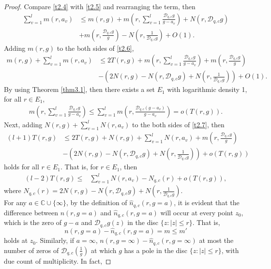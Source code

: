 \documentclass[sn-mathphys-num]{sn-jnl}%
\theoremstyle{thmstyleone}%
\theoremstyle{thmstyletwo}%
\theoremstyle{thmstylethree}%
\begin{document}
\begin{proof}
	Compare \eqref{t2.4} with \eqref{t2.5} and rearranging the term, then
	\begin{align}\label{t2.6}
		\sum_{v=1}^{l}m(r,a_{v})&\leq m(r,g)+m\left(r,\sum_{v=1}^{l}\frac{\mathcal{D}_{q,c}g}{g-a_{v}}\right)+N(r,\mathcal{D}_{q,c}g)\nonumber\\
		&+m\left(r,\frac{\mathcal{D}_{q,c}g}{g}\right)-N\left(r,\frac{1}{\mathcal{D}_{q,c}g}\right)+O(1).
	\end{align}
	\indent Adding $m(r,g)$ to the both sides of \eqref{t2.6},
	\begin{align}\label{t2.7}
		m(r,g)+\sum_{v=1}^{l}m(r,a_{v})&\leq 2T(r,g)+m\left(r,\sum_{v=1}^{l}\frac{\mathcal{D}_{q,c}g}{g-a_{v}}\right)
		+m\left(r,\frac{\mathcal{D}_{q,c}g}{g}\right)\nonumber\\
		&-\left(2N(r,g)-N(r,\mathcal{D}_{q,c}g)+N\left(r,\frac{1}{\mathcal{D}_{q,c}g}\right)\right)+O(1).
	\end{align}
	By using Theorem \ref{thm3.1}, then there exists a set \(E_{1}\) with logarithmic density 1, for all \(r\in E_{1}\),
	\begin{align*}
		m\left(r,\sum_{v=1}^{l}\frac{\mathcal{D}_{q,c}g}{g-a_{v}}\right)\leq\sum_{v=1}^{l}m\left(r,\frac{\mathcal{D}_{q,c}(g-a_{v})}{g-a_{v}}\right)
		=o(T(r,g)).
	\end{align*}
	Next, adding $N(r,g)+\sum_{v=1}^{l}N(r,a_{v})$ to the both sides of \eqref{t2.7}, then
	\begin{align*}
		(l+1)T(r,g)&\leq 2T(r,g)+N(r,g)+\sum_{v=1}^{l}N(r,a_{v})+m\left(r,\frac{\mathcal{D}_{q,c}g}{g}\right)&\\
		&-\left(2N(r,g)-N(r,\mathcal{D}_{q,c}g)+N\left(r,\frac{1}{\mathcal{D}_{q,c}g}\right)\right)+o(T(r,g))
	\end{align*}
	holds for all \(r\in E_{1}\). That is, for \(r\in E_{1}\), then
	\begin{align}\label{t2.7'}
		(l-2)T(r,g)\leq&\sum_{v=1}^{l}N(r,a_{v})-N_{q,c}(r)+o(T(r,g)),
	\end{align}
	where $N_{q,c}(r)=2N(r,g)-N(r,\mathcal{D}_{q,c}g)+N\left(r,\frac{1}{\mathcal{D}_{q,c}g}\right)$.\\
	\indent For any $a \in\mathbb{C}\cup\{\infty\}$, by the definition of \(\hat{n}_{q,c}(r,g=a)\), it is evident that the difference between \(n(r,g=a)\) and \(\hat{n}_{q,c}(r,g=a)\) will occur at every point \(z_{0}\), which is the zero of \(g-a\) and \(\mathcal{D}_{q,c}g(z)\) in the disc $\{z:|z|\leq r\}$. That is,
	$$n(r,g=a)-\hat{n}_{q,c}(r,g=a)=m\leq m'$$ holds at \(z_{0}\). Similarly, if $a=\infty$, $n(r,g=\infty)-\hat{n}_{q,c}(r,g=\infty)$ at most the number of zeros of $\mathcal{D}_{q,c}\left(\frac{1}{g}\right)$ at which $g$ has a pole in the disc $\{z:|z|\leq r\}$, with due count of multiplicity. In fact,

\end{proof}
\end{document}
